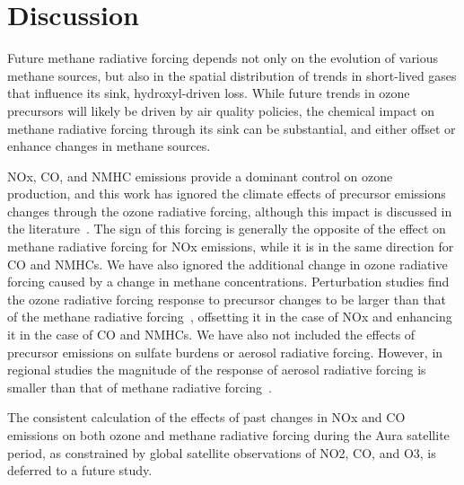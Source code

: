 \section{Discussion}

Future methane radiative forcing depends not only on the evolution of various methane sources, but also in the spatial distribution of trends in short-lived gases that influence its sink, hydroxyl-driven loss. While future trends in ozone precursors will likely be driven by air quality policies, the chemical impact on methane radiative forcing through its sink can be substantial, and either offset or enhance changes in methane sources.

NOx, CO, and NMHC emissions provide a dominant control on ozone production, and this work has ignored the climate effects of precursor emissions changes through the ozone radiative forcing, although this impact is discussed in the literature~\citep{ref:shindell2013}. The sign of this forcing is generally the opposite of the effect on methane radiative forcing for NOx emissions, while it is in the same direction for CO and NMHCs. We have also ignored the additional change in ozone radiative forcing caused by a change in methane concentrations. Perturbation studies find the ozone radiative forcing response to precursor changes to be larger than that of the methane radiative forcing~\citep{ref:akimoto2015}, offsetting it in the case of NOx and enhancing it in the case of CO and NMHCs. We have also not included the effects of precursor emissions on sulfate burdens or aerosol radiative forcing. However, in regional studies the magnitude of the response of aerosol radiative forcing is smaller than that of methane radiative forcing~\citep{ref:fry2012}.

The consistent calculation of the effects of past changes in NOx and CO emissions on both ozone and methane radiative forcing during the Aura satellite period, as constrained by global satellite observations of NO2, CO, and O3, is deferred to a future study. 






